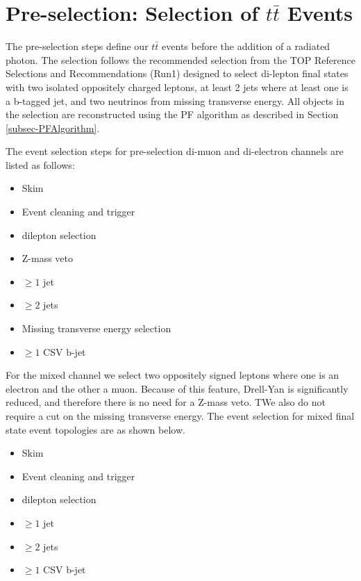 \section{Pre-selection: Selection of $t\bar{t}$ Events} \label{sec-preselection}

The pre-selection steps define our $t\bar{t}$ events before the addition of a radiated photon. The selection follows the recommended selection from the TOP Reference Selections and Recommendations (Run1) \cite{TopEventSelection} designed to select di-lepton final states with two isolated oppositely charged leptons, at least 2 jets where at least one is a b-tagged jet, and two neutrinos from missing transverse energy. All objects in the selection are reconstructed using the PF algorithm as described in Section \ref{subsec-PFAlgorithm}.  

The event selection steps for pre-selection di-muon and di-electron channels are listed as follows:  

\begin{itemize}
	\item Skim
	\item Event cleaning and trigger
	\item dilepton selection
	\item Z-mass veto
	\item $\geq 1$ jet
	\item $\geq 2$ jets
	\item Missing transverse energy selection
	\item $\geq 1$ CSV b-jet 
\end{itemize}

For the mixed channel we select two oppositely signed leptons where one is an electron and the other a muon. Because of this feature, Drell-Yan is significantly reduced, and therefore there is no need for a Z-mass veto. TWe also do not require a cut on the missing transverse energy. The event selection for mixed final state event topologies are as shown below.

\begin{itemize}
	\item Skim
	\item Event cleaning and trigger
	\item dilepton selection
	\item $\geq 1$ jet
	\item $\geq 2$ jets
	\item $\geq 1$ CSV b-jet 
\end{itemize}  

